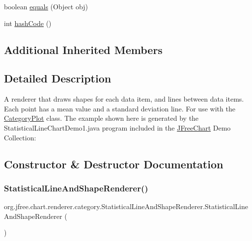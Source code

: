 \begin{DoxyCompactItemize}
\item 
boolean \mbox{\hyperlink{classorg_1_1jfree_1_1chart_1_1renderer_1_1category_1_1_statistical_line_and_shape_renderer_adac4e1194a9da3f47dafedea31985a20}{equals}} (Object obj)
\item 
int \mbox{\hyperlink{classorg_1_1jfree_1_1chart_1_1renderer_1_1category_1_1_statistical_line_and_shape_renderer_a367bfeddca3f8f3f00d9bc6ad7975055}{hash\+Code}} ()
\end{DoxyCompactItemize}
\subsection*{Additional Inherited Members}


\subsection{Detailed Description}
A renderer that draws shapes for each data item, and lines between data items. Each point has a mean value and a standard deviation line. For use with the \mbox{\hyperlink{}{Category\+Plot}} class. The example shown here is generated by the {\ttfamily Statistical\+Line\+Chart\+Demo1.\+java} program included in the \mbox{\hyperlink{classorg_1_1jfree_1_1chart_1_1_j_free_chart}{J\+Free\+Chart}} Demo Collection\+: ~\newline
~\newline
  

\subsection{Constructor \& Destructor Documentation}
\mbox{\label{classorg_1_1jfree_1_1chart_1_1renderer_1_1category_1_1_statistical_line_and_shape_renderer_aaab2c171744659fc7b1f61c98842caf5}} 
\subsubsection{\texorpdfstring{Statistical\+Line\+And\+Shape\+Renderer()}{StatisticalLineAndShapeRenderer()}\hspace{0.1cm}{\footnotesize\ttfamily [1/2]}}
{\footnotesize\ttfamily org.\+jfree.\+chart.\+renderer.\+category.\+Statistical\+Line\+And\+Shape\+Renderer.\+Statistical\+Line\+And\+Shape\+Renderer (\begin{DoxyParamCaption}{ }\end{DoxyParamCaption})}

